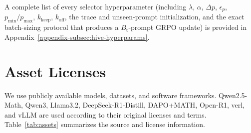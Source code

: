 A complete list of every selector hyperparameter (including $\lambda$, $\alpha$, $\Delta p$, $\epsilon_p$, $p_{\min}/p_{\max}$, $k_{\mathrm{keep}}$, $k_{\mathrm{off}}$, the trace and unseen-prompt initialization, and the exact batch-sizing protocol that produces a $B_{\mathrm{t}}$-prompt GRPO update) is provided in Appendix~\ref{appendix-subsec:hive-hyperparams}.

\section{Asset Licenses}
\label{sec:asset-licenses}
We use publicly available models, datasets, and software frameworks. 
Qwen2.5-Math, Qwen3, Llama3.2, DeepSeek-R1-Distill, DAPO+MATH, Open-R1, verl, and vLLM are used according to their original licenses and terms.  Table~\ref{tab:assets} summarizes the source and license information.

\begin{table}[h]
\centering
\caption{Sources and licenses of publicly available assets used in this work.}
\label{tab:assets}
\end{table}